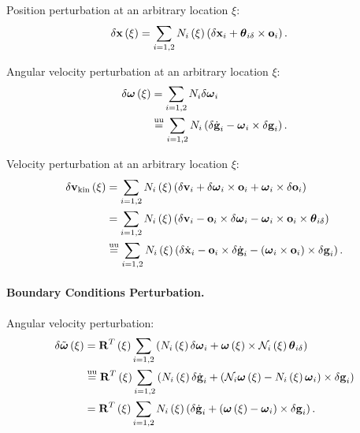 Position perturbation at an arbitrary location $\xi$:
\begin{align}
	\delta\bm{\mathbf{x}}\left( \xi \right)
	&=
	\sum_{i=1,2} N_i\left( \xi \right) \left( 
		\delta\bm{\mathbf{x}}_i + \bm{\mathbf{\theta}}_{i\delta}\times\bm{\mathbf{o}}_i
	 \right)
	.
\end{align}

Angular velocity perturbation at an arbitrary location $\xi$:
\begin{align}
	\delta\bm{\mathbf{\omega}}\left( \xi \right)
	&=
	\sum_{i=1,2} N_i \delta\bm{\mathbf{\omega}}_i
	\nonumber \\
	&\overset{\text{uu}}{=}
	\sum_{i=1,2} N_i \left( 
		\delta\dot{\bm{\mathbf{g}}}_i
		- \bm{\mathbf{\omega}}_i \times \delta\bm{\mathbf{g}}_i
	 \right)
	.
\end{align}

Velocity perturbation at an arbitrary location $\xi$:
\begin{align}
	\delta\bm{\mathbf{v}}_{\text{kin}}\left( \xi \right)
	&=
	\sum_{i=1,2} N_i\left( \xi \right) \left( 
		\delta\bm{\mathbf{v}}_i
		+ \delta\bm{\mathbf{\omega}}_i \times \bm{\mathbf{o}}_i
		+ \bm{\mathbf{\omega}}_i \times \delta\bm{\mathbf{o}}_i
	 \right)
	\nonumber \\
	&= 
	\sum_{i=1,2} N_i\left( \xi \right) \left( 
		\delta\bm{\mathbf{v}}_i
		- \bm{\mathbf{o}}_i \times \delta\bm{\mathbf{\omega}}_i
		- \bm{\mathbf{\omega}}_i \times \bm{\mathbf{o}}_i \times \bm{\mathbf{\theta}}_{i\delta}
	 \right)
	\nonumber \\
	&\overset{\text{uu}}{=}
	\sum_{i=1,2} N_i\left( \xi \right) \left( 
		\delta\dot{\bm{\mathbf{x}}}_i
		- \bm{\mathbf{o}}_i \times \delta\dot{\bm{\mathbf{g}}}_i
		- \left( \bm{\mathbf{\omega}}_i \times \bm{\mathbf{o}}_i \right) \times \delta\bm{\mathbf{g}}_i
	 \right)
	.
\end{align}


\paragraph{Boundary Conditions Perturbation.}
Angular velocity perturbation:
\begin{align}
	\delta\tilde{\bm{\mathbf{\omega}}}\left( \xi \right)
	&= \bm{\mathbf{R}}^T\left( \xi \right) \sum_{i=1,2} \left( 
		N_i\left( \xi \right) \delta\bm{\mathbf{\omega}}_i
		+ \bm{\mathbf{\omega}}\left( \xi \right) \times \mathcal{N}_i\left( \xi \right) \bm{\mathbf{\theta}}_{i\delta}
	 \right)
	\nonumber \\
	&\overset{\text{uu}}{=}
	\bm{\mathbf{R}}^T\left( \xi \right) \sum_{i=1,2} \left( 
		N_i\left( \xi \right) \delta\dot{\bm{\mathbf{g}}}_i
		+ \left( 
			\mathcal{N}_i \bm{\mathbf{\omega}}\left( \xi \right)
			- N_i\left( \xi \right) \bm{\mathbf{\omega}}_i
		 \right) \times \delta\bm{\mathbf{g}}_i
	 \right)
	\nonumber \\
	&=
	\bm{\mathbf{R}}^T\left( \xi \right) \sum_{i=1,2} N_i\left( \xi \right) \left( 
		\delta\dot{\bm{\mathbf{g}}}_i
		+ \left( 
			\bm{\mathbf{\omega}}\left( \xi \right)
			- \bm{\mathbf{\omega}}_i
		 \right) \times \delta\bm{\mathbf{g}}_i
	 \right)
	.
\end{align}

